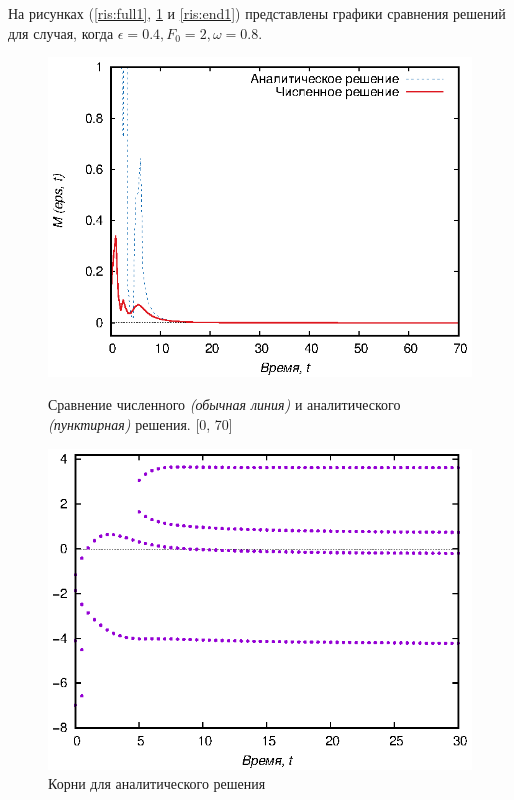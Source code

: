 \documentclass[%
bachelor,    %
natbib,      %
subf,        %
href,        %
colorlinks,  %
]{disser}
\begin{document}
На рисунках (\ref{ris:full1}, \ref{ris:rootsend1} и \ref{ris:end1}) представлены графики сравнения решений для случая, когда $\epsilon = 0.4, F_0 = 2, \omega = 0.8$.

\begin{figure}[h]
	\begin{center}
		\begin{minipage}[h]{0.45\linewidth}
			\includegraphics[width=1\linewidth]{full1}
			\caption{Сравнение численного \textit{(обычная линия)} и аналитического \textit{(пунктирная)} решения. [0, 70]} %
			\label{ris:full1} %
		\end{minipage}
		\hfill 
		\begin{minipage}[h]{0.45\linewidth}
			\includegraphics[width=1\linewidth]{rootsend1}
			\caption{Корни для аналитического решения }
			\label{ris:rootsend1}
		\end{minipage}
	\end{center}
\end{figure}
\end{document}
